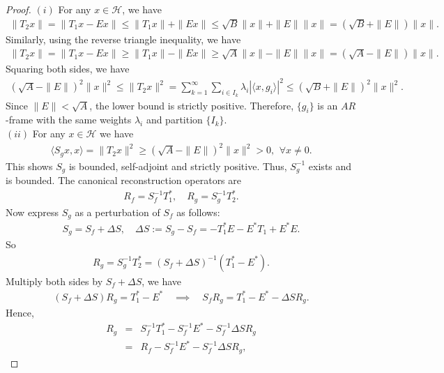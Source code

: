 \documentclass[12pt,titlepage]{amsart}
\theoremstyle{definition}
\theoremstyle{remark}
\begin{document}
\begin{proof}
$(i)$ For any $x \in \mathcal{H}$, we have
\begin{eqnarray*}
\|T_2 x\| = \|T_1 x - E x\| \le \|T_1 x\| + \|E x\| \le \sqrt{B}
\|x\| + \|E\| \|x\| = (\sqrt{B} + \|E\|) \|x\|.
\end{eqnarray*}
Similarly, using the reverse triangle inequality, we have
\begin{eqnarray*}
\|T_2 x\| = \|T_1 x - E x\| \ge \|T_1 x\| - \|E x\| \ge \sqrt{A}
\|x\| - \|E\| \|x\| = (\sqrt{A} - \|E\|) \|x\|.
\end{eqnarray*}
Squaring both sides, we have
\begin{eqnarray*}
(\sqrt{A} - \|E\|)^2 \|x\|^2 \le \|T_2 x\|^2 = \sum_{k=1}^\infty
\sum_{i \in I_k} \lambda_i |\langle x, g_i \rangle|^2 \le
(\sqrt{B} + \|E\|)^2 \|x\|^2.
\end{eqnarray*}
Since $\|E\| < \sqrt{A}$, the lower bound is strictly positive.
Therefore, $\{ g_i \}$ is an $AR$-frame with the same weights
$\lambda_i$ and partition $\{ I_k \}$.\\
$(ii)$ For any $x \in \mathcal{H}$ we have
\begin{eqnarray*}
\langle S_g x, x \rangle = \|T_2 x\|^2 \ge (\sqrt{A} - \|E\|)^2
\|x\|^2 > 0, \,\ \forall x \neq 0.
\end{eqnarray*}
This shows $S_g$ is bounded, self-adjoint and strictly positive.
Thus, $S_g^{-1}$ exists and is bounded. The canonical
reconstruction operators are
\begin{eqnarray*}
R_f = S_f^{-1} T_1^*, \quad R_g = S_g^{-1} T_2^*.
\end{eqnarray*}
Now express $S_g$ as a perturbation of $S_f$ as follows:
\begin{eqnarray*}
S_g = S_f + \Delta S, \quad \Delta S := S_g - S_f = -T_1^* E - E^*
T_1 + E^* E.
\end{eqnarray*}
So
\begin{eqnarray*}
R_g = S_g^{-1} T_2^* = (S_f + \Delta S)^{-1} (T_1^* - E^*).
\end{eqnarray*}
Multiply both sides by $S_f + \Delta S$, we have
\begin{eqnarray*}
(S_f + \Delta S) R_g = T_1^* - E^* \quad \implies \quad S_f R_g =
T_1^* - E^* - \Delta S R_g.
\end{eqnarray*}
Hence,
\begin{eqnarray*}
R_g &=& S_f^{-1} T_1^* - S_f^{-1} E^* - S_f^{-1} \Delta S R_g\\
&=& R_f - S_f^{-1} E^* - S_f^{-1} \Delta S R_g,
\end{eqnarray*}

\end{proof}
\end{document}

